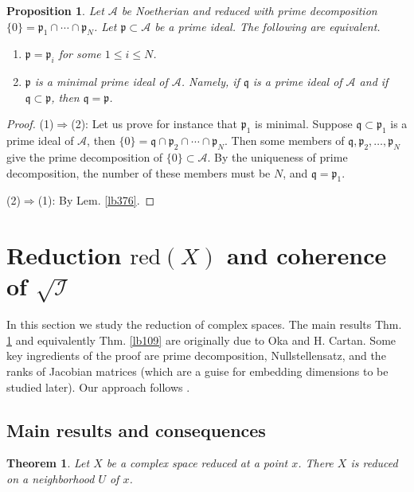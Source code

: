 \documentclass[12pt,b5paper,notitlepage]{report}
\theoremstyle{definition}
\theoremstyle{plain}
\newtheorem{thm}[df]{Theorem}
\newtheorem{pp}[df]{Proposition}
\newcommand{\fk}{\mathfrak}
\newcommand{\mc}{\mathcal}
\newcommand{\pk}{\mathfrak p}
\newcommand{\red}{\mathrm{red}}
\numberwithin{equation}{section}
\begin{document}
\begin{pp}\label{lb374}
Let $\mc A$ be Noetherian and reduced with prime decomposition $\{0\}=\pk_1\cap\cdots\cap\pk_N$. Let $\pk\subset\mc A$ be a prime ideal. The following are equivalent.
\begin{enumerate}[label=(\arabic*)]
\item $\pk=\pk_i$ for some $1\leq i\leq N$.
\item $\pk$ is a minimal prime ideal of $\mc A$. Namely, if $\fk q$ is a prime ideal of $\mc A$ and if $\fk q\subset\pk$, then $\fk q=\pk$.
\end{enumerate}
\end{pp}

\begin{proof}
(1)$\Rightarrow$(2): Let us prove for instance that $\pk_1$ is minimal. Suppose $\fk q\subset\pk_1$ is a prime ideal of $\mc A$, then $\{0\}=\fk q\cap\pk_2\cap\cdots\cap\pk_N$. Then some members of $\fk q,\pk_2,\dots,\pk_N$ give the prime decomposition of $\{0\}\subset\mc A$. By the uniqueness of prime decomposition, the number of these members must be $N$, and $\fk q=\pk_1$.

(2)$\Rightarrow$(1): By Lem. \ref{lb376}.
\end{proof}










\section{Reduction $\red(X)$ and coherence of $\sqrt{\mc I}$}\label{lb381}


In this section we study the reduction of complex spaces. The main results Thm. \ref{lb108} and equivalently Thm. \ref{lb109} are originally due to Oka and H. Cartan. Some key ingredients of the proof are prime decomposition, Nullstellensatz, and the ranks of Jacobian matrices (which are a guise for embedding dimensions to be studied later). Our approach follows \cite{GPR}.

\subsection{Main results and consequences}

\begin{thm}\label{lb108}
Let $X$ be a complex space reduced at a point $x$. There $X$ is reduced on a neighborhood $U$ of $x$.
\end{thm}
\end{document}
